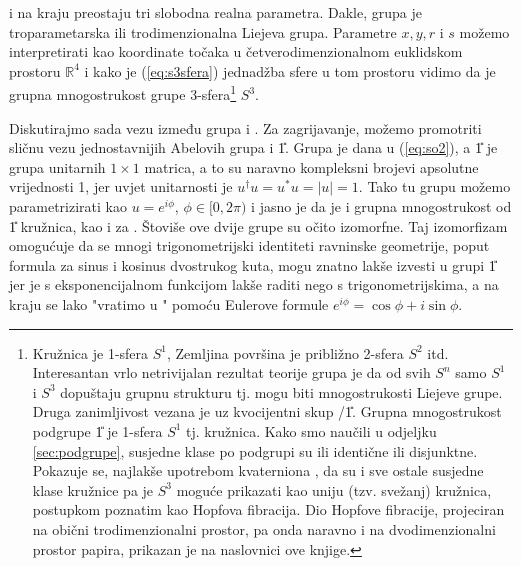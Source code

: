 i na kraju preostaju tri slobodna realna parametra. Dakle, grupa  je troparametarska
ili trodimenzionalna Liejeva grupa. Parametre $x, y, r$ i $s$ možemo interpretirati
kao koordinate točaka u četverodimenzionalnom euklidskom prostoru $\mathbb{R}^4$
i kako je (\ref{eq:s3sfera}) jednadžba sfere u tom prostoru vidimo da je
grupna mnogostrukost grupe  3-sfera\footnote{Kružnica je 1-sfera $S^1$,
    Zemljina površina je približno 2-sfera $S^2$ itd. Interesantan vrlo
    netrivijalan rezultat teorije grupa je da od svih $S^n$ samo $S^1$ i $S^3$ dopuštaju
grupnu strukturu tj. mogu biti mnogostrukosti Liejeve grupe.
Druga zanimljivost vezana je uz kvocijentni skup /\U{1}. Grupna mnogostrukost
podgrupe \U{1} je 1-sfera $S^1$ tj. kružnica. Kako smo naučili u odjeljku \ref{sec:podgrupe},
susjedne klase po podgrupi su ili identične ili disjunktne. Pokazuje se,
najlakše upotrebom kvaterniona \cite{Stilwell:2008}, da su i sve ostale
susjedne klase kružnice pa je $S^3$ moguće prikazati kao uniju (tzv. svežanj)
kružnica, postupkom poznatim kao Hopfova fibracija. Dio Hopfove fibracije,
projeciran na obični trodimenzionalni prostor, pa onda naravno i na
dvodimenzionalni prostor papira, prikazan je na naslovnici ove knjige.} $S^3$.


Diskutirajmo sada vezu između grupa  i . Za zagrijavanje, možemo
promotriti sličnu vezu jednostavnijih Abelovih grupa  i \U{1}. Grupa  je dana
u (\ref{eq:so2}), a \U{1} je grupa unitarnih $1 \times 1$
matrica, a to su naravno kompleksni brojevi apsolutne vrijednosti 1, jer uvjet
unitarnosti je $u^\dagger u = u^* u = |u| = 1$. Tako tu grupu možemo
parametrizirati kao $u = e^{i\phi}$, $\phi\in [0, 2\pi)$ i jasno je da je
i grupna mnogostrukost od \U{1} kružnica, kao i za . Štoviše ove dvije
grupe su očito izomorfne. Taj izomorfizam omogućuje da se mnogi
trigonometrijski identiteti ravninske geometrije, poput formula za sinus i kosinus dvostrukog kuta,
mogu znatno lakše izvesti u grupi \U{1} jer je s eksponencijalnom
funkcijom lakše raditi nego s trigonometrijskima, a na kraju se lako "vratimo
u " pomoću Eulerove formule $e^{i\phi} = \cos\phi + i\sin\phi$.

